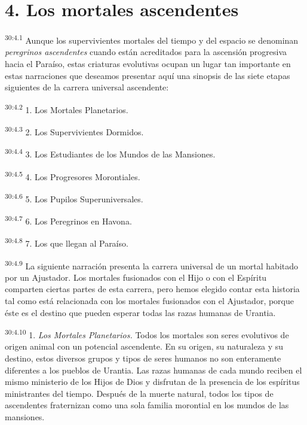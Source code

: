 \section*{4. Los mortales ascendentes}
\par
\textsuperscript{30:4.1} Aunque los supervivientes mortales del tiempo y del espacio se denominan \textit{peregrinos ascendentes} cuando están acreditados para la ascensión progresiva hacia el Paraíso, estas criaturas evolutivas ocupan un lugar tan importante en estas narraciones que deseamos presentar aquí una sinopsis de las siete etapas siguientes de la carrera universal ascendente:

\par
\textsuperscript{30:4.2} 1. Los Mortales Planetarios.

\par
\textsuperscript{30:4.3} 2. Los Supervivientes Dormidos.

\par
\textsuperscript{30:4.4} 3. Los Estudiantes de los Mundos de las Mansiones.

\par
\textsuperscript{30:4.5} 4. Los Progresores Morontiales.

\par
\textsuperscript{30:4.6} 5. Los Pupilos Superuniversales.

\par
\textsuperscript{30:4.7} 6. Los Peregrinos en Havona.

\par
\textsuperscript{30:4.8} 7. Los que llegan al Paraíso.

\par
\textsuperscript{30:4.9} La siguiente narración presenta la carrera universal de un mortal habitado por un Ajustador. Los mortales fusionados con el Hijo o con el Espíritu comparten ciertas partes de esta carrera, pero hemos elegido contar esta historia tal como está relacionada con los mortales fusionados con el Ajustador, porque éste es el destino que pueden esperar todas las razas humanas de Urantia.

\par
\textsuperscript{30:4.10} 1. \textit{Los Mortales Planetarios.} Todos los mortales son seres evolutivos de origen animal con un potencial ascendente. En su origen, su naturaleza y su destino, estos diversos grupos y tipos de seres humanos no son enteramente diferentes a los pueblos de Urantia. Las razas humanas de cada mundo reciben el mismo ministerio de los Hijos de Dios y disfrutan de la presencia de los espíritus ministrantes del tiempo. Después de la muerte natural, todos los tipos de ascendentes fraternizan como una sola familia morontial en los mundos de las mansiones.

